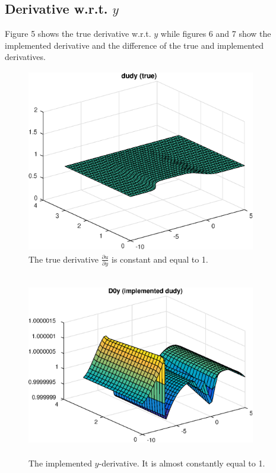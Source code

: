 \documentclass[a4paper,10pt]{article}
\begin{document}
\FloatBarrier
\subsection*{Derivative w.r.t. $y$}
Figure 5 shows the true derivative w.r.t. $y$ while figures 6 and 7 show the implemented derivative
and the difference of the true and implemented derivatives.
\FloatBarrier

\begin{figure}[ht]
  \centering
  \includegraphics[width = 10cm, height = 8cm]{dudy}
  \begin{minipage}[t]{100mm}
    \caption{
      The true derivative $\tfrac{\partial u}{\partial y}$ is constant and
      equal to 1.
    }\label{FIG_jjj}
  \end{minipage}
\end{figure}


\begin{figure}[ht]
  \centering
  \includegraphics[width = 10cm, height = 8cm]{D0y}
  \begin{minipage}[t]{100mm}
    \caption{
      The implemented $y$-derivative. It is almost constantly equal to 1.
    }\label{FIG_jjj}
  \end{minipage}
\end{figure}
\end{document}
